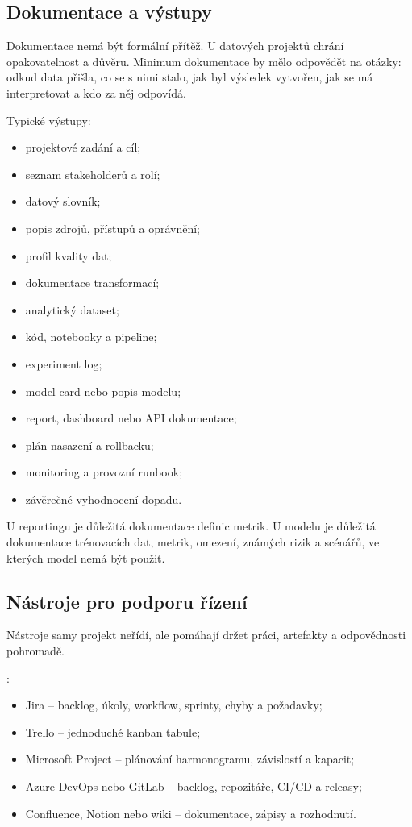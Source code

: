 \subsection{Dokumentace a výstupy}
Dokumentace nemá být formální přítěž. U datových projektů chrání opakovatelnost a důvěru. Minimum dokumentace by mělo odpovědět na otázky: odkud data přišla, co se s nimi stalo, jak byl výsledek vytvořen, jak se má interpretovat a kdo za něj odpovídá.

Typické výstupy:
\begin{itemize}
  \item projektové zadání a cíl;
  \item seznam stakeholderů a rolí;
  \item datový slovník;
  \item popis zdrojů, přístupů a oprávnění;
  \item profil kvality dat;
  \item dokumentace transformací;
  \item analytický dataset;
  \item kód, notebooky a pipeline;
  \item experiment log;
  \item model card nebo popis modelu;
  \item report, dashboard nebo API dokumentace;
  \item plán nasazení a rollbacku;
  \item monitoring a provozní runbook;
  \item závěrečné vyhodnocení dopadu.
\end{itemize}

U reportingu je důležitá dokumentace definic metrik. U modelu je důležitá dokumentace trénovacích dat, metrik, omezení, známých rizik a scénářů, ve kterých model nemá být použit.

\subsection{Nástroje pro podporu řízení}
Nástroje samy projekt neřídí, ale pomáhají držet práci, artefakty a odpovědnosti pohromadě.

:
\begin{itemize}
  \item Jira -- backlog, úkoly, workflow, sprinty, chyby a požadavky;
  \item Trello -- jednoduché kanban tabule;
  \item Microsoft Project -- plánování harmonogramu, závislostí a kapacit;
  \item Azure DevOps nebo GitLab -- backlog, repozitáře, CI/CD a releasy;
  \item Confluence, Notion nebo wiki -- dokumentace, zápisy a rozhodnutí.
\end{itemize}


